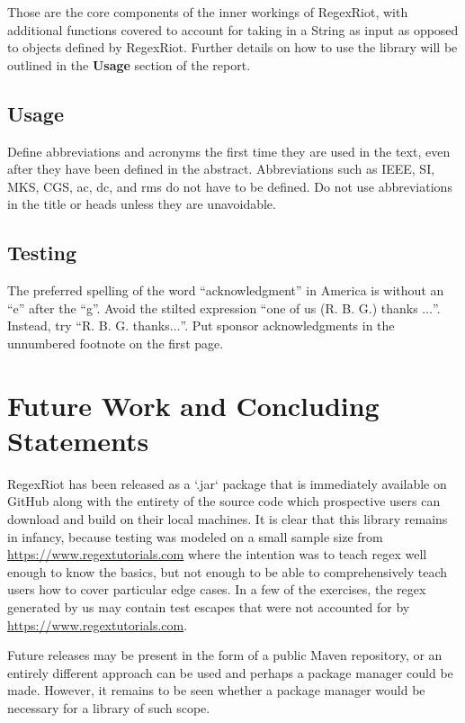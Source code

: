 \documentclass[conference]{IEEEtran}
\begin{document}
Those are the core components of the inner workings of RegexRiot,
with additional functions covered to account for taking in a String
as input as opposed to objects defined by RegexRiot.
Further details on how to use the library will be outlined in
the \textbf{Usage} section of the report.

\subsection{Usage}
Define abbreviations and acronyms the first time they are used in the text,
even after they have been defined in the abstract. Abbreviations such as
IEEE, SI, MKS, CGS, ac, dc, and rms do not have to be defined. Do not use
abbreviations in the title or heads unless they are unavoidable.


\subsection{Testing}

The preferred spelling of the word ``acknowledgment'' in America is without
an ``e'' after the ``g''. Avoid the stilted expression ``one of us (R. B.
G.) thanks $\ldots$''. Instead, try ``R. B. G. thanks$\ldots$''. Put sponsor
acknowledgments in the unnumbered footnote on the first page.

\vfill\eject

\section{Future Work and Concluding Statements}

RegexRiot has been released as a `.jar` package that is immediately available
on GitHub along with the entirety of the source code which prospective users
can download and build on their local machines. It is clear that this library
remains in infancy, because testing was modeled on a small sample size from
\url{https://www.regextutorials.com} where the intention was to
teach regex well enough to know the basics, but not enough to be able to
comprehensively teach users how to cover particular edge cases.
In a few of the exercises, the regex generated by us may contain test escapes
that were not accounted for by \url{https://www.regextutorials.com}.

Future releases may be present in the form of a public Maven repository,
or an entirely different approach can be used and perhaps a package manager
could be made. However, it remains to be seen whether a package manager would
be necessary for a library of such scope.
\end{document}
